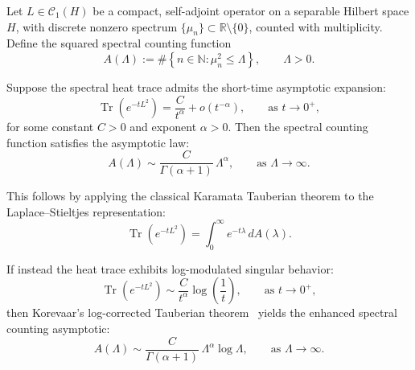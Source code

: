 \begin{definition}
\label{def:tauberian-theorem}
Let \( L \in \mathcal{C}_1(H) \) be a compact, self-adjoint operator on a separable Hilbert space \( H \), with discrete nonzero spectrum \( \{ \mu_n \} \subset \mathbb{R} \setminus \{0\} \), counted with multiplicity. Define the squared spectral counting function
\[
A(\Lambda) := \#\left\{ n \in \mathbb{N} : \mu_n^2 \le \Lambda \right\}, \qquad \Lambda > 0.
\]

Suppose the spectral heat trace admits the short-time asymptotic expansion:
\[
\operatorname{Tr}(e^{-t L^2}) = \frac{C}{t^\alpha} + o(t^{-\alpha}), \qquad \text{as } t \to 0^+,
\]
for some constant \( C > 0 \) and exponent \( \alpha > 0 \). Then the spectral counting function satisfies the asymptotic law:
\[
A(\Lambda) \sim \frac{C}{\Gamma(\alpha + 1)} \, \Lambda^\alpha, \qquad \text{as } \Lambda \to \infty.
\]

\medskip
\noindent
This follows by applying the classical Karamata Tauberian theorem to the Laplace–Stieltjes representation:
\[
\operatorname{Tr}(e^{-t L^2}) = \int_0^\infty e^{-t \lambda} \, dA(\lambda).
\]

\medskip
\noindent
If instead the heat trace exhibits log-modulated singular behavior:
\[
\operatorname{Tr}(e^{-t L^2}) \sim \frac{C}{t^\alpha} \log\left( \frac{1}{t} \right), \qquad \text{as } t \to 0^+,
\]
then Korevaar’s log-corrected Tauberian theorem~\cite[Ch.~III, §5]{Korevaar2004Tauberian} yields the enhanced spectral counting asymptotic:
\[
A(\Lambda) \sim \frac{C}{\Gamma(\alpha + 1)} \, \Lambda^\alpha \log \Lambda, \qquad \text{as } \Lambda \to \infty.
\]
\end{definition}
